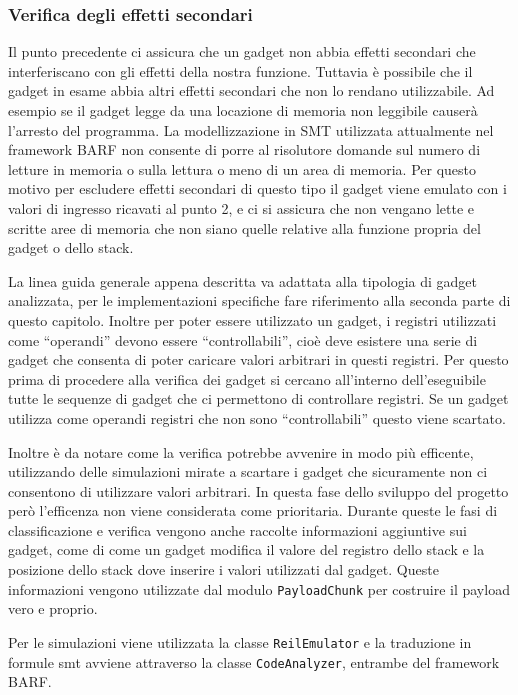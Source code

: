 \subsubsection{Verifica degli effetti secondari}  

Il punto precedente ci assicura che un gadget non abbia effetti
secondari che interferiscano con gli effetti della nostra
funzione. Tuttavia è possibile che il gadget in esame abbia altri
effetti secondari che non lo rendano utilizzabile. Ad esempio se il
gadget legge da una locazione di memoria non leggibile causerà
l'arresto del programma. La modellizzazione in SMT utilizzata
attualmente nel framework BARF non consente di porre al risolutore
domande sul numero di letture in memoria o sulla lettura o meno di
un area di memoria. Per questo motivo per escludere effetti
secondari di questo tipo il gadget viene emulato con i valori di
ingresso ricavati al punto 2, e ci si assicura che non vengano lette
e scritte aree di memoria che non siano quelle relative alla
funzione propria del gadget o dello stack.


La linea guida generale appena descritta va adattata alla tipologia di
gadget analizzata, per le implementazioni specifiche fare riferimento
alla seconda parte di questo capitolo. Inoltre per poter essere
utilizzato un gadget, i registri utilizzati come ``operandi'' devono
essere ``controllabili'', cioè deve esistere una serie di gadget che
consenta di poter caricare valori arbitrari in questi registri. Per
questo prima di procedere alla verifica dei gadget si cercano
all'interno dell'eseguibile tutte le sequenze di gadget che ci
permettono di controllare registri. Se un gadget utilizza come
operandi registri che non sono ``controllabili'' questo viene
scartato.

Inoltre è da notare come la verifica potrebbe avvenire in modo più
efficente, utilizzando delle simulazioni mirate a scartare i gadget
che sicuramente non ci consentono di utilizzare valori arbitrari. In
questa fase dello sviluppo del progetto però l'efficenza non viene
considerata come prioritaria.  Durante queste le fasi di
classificazione e verifica vengono anche raccolte informazioni
aggiuntive sui gadget, come di come un gadget modifica il valore del
registro dello stack e la posizione dello stack dove inserire i valori
utilizzati dal gadget. Queste informazioni vengono utilizzate dal
modulo \lstinline{PayloadChunk} per costruire il payload vero e proprio.


Per le simulazioni viene utilizzata la classe \lstinline{ReilEmulator}
e la traduzione in formule smt avviene attraverso la classe
\lstinline{CodeAnalyzer}, entrambe del framework BARF.



